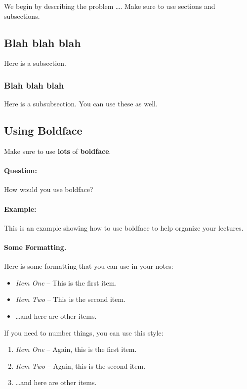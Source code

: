 \documentclass[11pt]{article}
\begin{document}
We begin by describing the problem \ldots.
Make sure to use sections and subsections.

\subsection{Blah blah blah}
Here is a subsection.

\subsubsection{Blah blah blah}
Here is a subsubsection. You can use these as well.

\subsection{Using Boldface}
Make sure to use \textbf{lots} of {\bf boldface}.

\paragraph{Question:}
How would you use boldface?

\paragraph{Example:}
This is an example showing how to use boldface to 
help organize your lectures.


\paragraph{Some Formatting.}
Here is some formatting that you can use in your notes:
\begin{itemize}
\item {\em Item One} -- This is the first item.
\item {\em Item Two} -- This is the second item.
\item \dots and here are other items.
\end{itemize}

If you need to number things, you can use this style:
\begin{enumerate}
\item {\em Item One} -- Again, this is the first item.
\item {\em Item Two} -- Again, this is the second item.
\item \dots and here are other items.
\end{enumerate}
\end{document}
